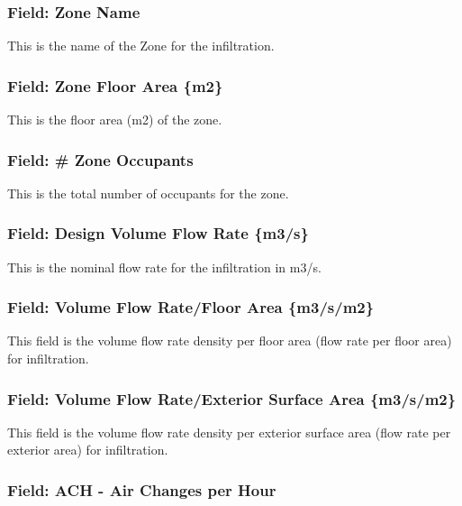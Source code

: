 \subsubsection{Field: Zone Name}\label{field-zone-name-7}

This is the name of the Zone for the infiltration.

\subsubsection{Field: Zone Floor Area \{m2\}}\label{field-zone-floor-area-m2-5}

This is the floor area (m2) of the zone.

\subsubsection{Field: \# Zone Occupants}\label{field-zone-occupants-5}

This is the total number of occupants for the zone.

\subsubsection{Field: Design Volume Flow Rate \{m3/s\}}\label{field-design-volume-flow-rate-m3s}

This is the nominal flow rate for the infiltration in m3/s.

\subsubsection{Field: Volume Flow Rate/Floor Area \{m3/s/m2\}}\label{field-volume-flow-ratefloor-area-m3sm2}

This field is the volume flow rate density per floor area (flow rate per floor area) for infiltration.

\subsubsection{Field: Volume Flow Rate/Exterior Surface Area \{m3/s/m2\}}\label{field-volume-flow-rateexterior-surface-area-m3sm2}

This field is the volume flow rate density per exterior surface area (flow rate per exterior area) for infiltration.

\subsubsection{Field: ACH - Air Changes per Hour}\label{field-ach---air-changes-per-hour}

